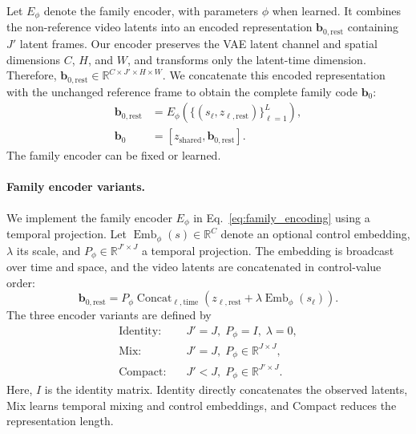 Let $E_\phi$ denote the family encoder, with parameters $\phi$ when learned.
It combines the non-reference video latents into an encoded representation
$\mathbf b_{0,\mathrm{rest}}$ containing $J'$ latent frames. Our encoder
preserves the VAE latent channel and spatial dimensions $C$, $H$, and $W$,
and transforms only the latent-time dimension. Therefore,
$\mathbf b_{0,\mathrm{rest}}\in
\mathbb R^{C\times J'\times H\times W}$. We concatenate this encoded
representation with the unchanged reference frame to obtain the complete
family code $\mathbf b_0$:
\begin{equation}
\begin{aligned}
    \mathbf b_{0,\mathrm{rest}}
      &=E_\phi\!\left(\{(s_\ell,z_{\ell,\mathrm{rest}})\}_{\ell=1}^{L}\right),\\
    \mathbf b_0&=[z_{\mathrm{shared}},\mathbf b_{0,\mathrm{rest}}].
\end{aligned}
\label{eq:family_encoding}
\end{equation}
The family encoder can be fixed or learned.



\paragraph{Family encoder variants.}
We implement the family encoder $E_\phi$ in
Eq.~\ref{eq:family_encoding} using a temporal projection.
Let $\operatorname{Emb}_\phi(s)\in\mathbb R^C$ denote an optional
control embedding, $\lambda$ its scale, and
$P_\phi\in\mathbb R^{J'\times J}$ a temporal projection.
The embedding is broadcast over time and space, and the video
latents are concatenated in control-value order:
\begin{equation}
    \mathbf b_{0,\mathrm{rest}}
    =P_\phi\operatorname{Concat}_{\ell,\mathrm{time}}
    \left(z_{\ell,\mathrm{rest}}
    +\lambda\operatorname{Emb}_\phi(s_\ell)\right).
    \label{eq:family_mixer}
\end{equation}
The three encoder variants are defined by
\[
\begin{aligned}
    \text{Identity:}\quad &J'=J,\; P_\phi=I,\; \lambda=0,\\
    \text{Mix:}\quad &J'=J,\; P_\phi\in\mathbb R^{J\times J},\\
    \text{Compact:}\quad &J'<J,\; P_\phi\in\mathbb R^{J'\times J}.
\end{aligned}
\]
Here, $I$ is the identity matrix. Identity directly concatenates
the observed latents, Mix learns temporal mixing and control
embeddings, and Compact reduces the representation length.




